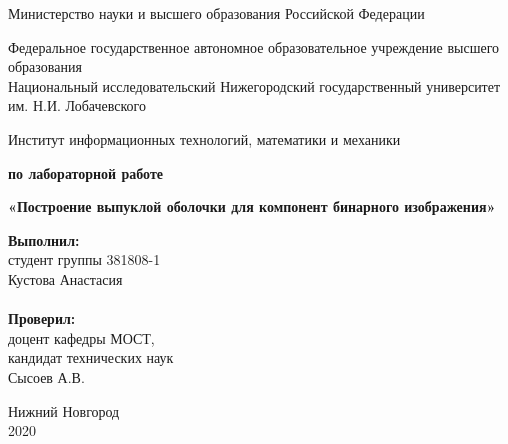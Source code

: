\documentclass{report}
\begin{document}
\begin{titlepage}

\begin{center}
Министерство науки и высшего образования Российской Федерации
\end{center}

\begin{center}
Федеральное государственное автономное образовательное учреждение высшего образования \\
Национальный исследовательский Нижегородский государственный университет им. Н.И. Лобачевского
\end{center}

\begin{center}
Институт информационных технологий, математики и механики
\end{center}

\vspace{4em}

\begin{center}
\textbf{ по лабораторной работе} \\
\end{center}
\begin{center}
\textbf{\Large«Построение выпуклой оболочки для компонент бинарного изображения»} \\
\end{center}

\vspace{4em}

\newbox{\lbox}
\newlength{\maxl}
\setlength{\maxl}{\wd\lbox}
\hfill\parbox{7cm}{
\hspace*{5cm}\hspace*{-5cm}\textbf{Выполнил:} \\ студент группы 381808-1 \\ Кустова Анастасия\\
\\
\hspace*{5cm}\hspace*{-5cm}\textbf{Проверил:}\\ доцент кафедры МОСТ, \\ кандидат технических наук \\ Сысоев А.В.\\
}
\vspace{\fill}

\begin{center} Нижний Новгород \\ 2020 \end{center}

\end{titlepage}
\end{document}
